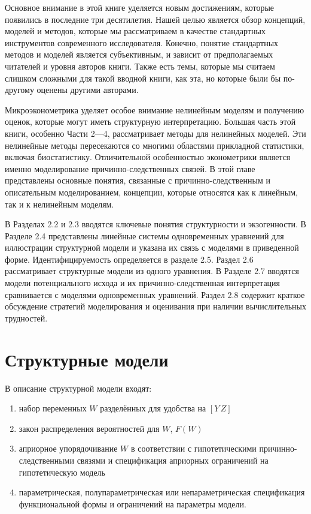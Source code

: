 	
	Основное внимание в этой книге уделяется новым достижениям, которые появились в последние три десятилетия. Нашей целью является обзор концепций, моделей и методов, которые мы рассматриваем в качестве стандартных  инструментов современного исследователя. Конечно, понятие стандартных методов и моделей является субъективным, и зависит от предполагаемых читателей и уровня авторов книги. Также есть темы, которые мы считаем слишком сложными для такой вводной книги, как эта, но которые были бы по-другому оценены другими авторами.
	
		
	Микроэконометрика уделяет особое внимание нелинейным моделям и получению оценок, которые могут иметь структурную интерпретацию. Большая часть этой книги, особенно Части 2---4, рассматривает методы для нелинейных моделей. Эти нелинейные методы пересекаются со многими областями прикладной статистики, включая биостатистику. Отличительной особенностью эконометрики является именно моделирование причинно-следственных связей. В этой главе представлены основные понятия, связанные с причинно-следственным и описательным моделированием, концепции, которые относятся как к линейным, так и к нелинейным моделям. 
	
	
	В Разделах 2.2 и 2.3 вводятся ключевые понятия структурности и экзогенности. В Разделе 2.4 представлены линейные системы одновременных уравнений для иллюстрации структурной модели и указана их связь с моделями в приведенной форме. Идентифицируемость определяется в разделе 2.5.  Раздел 2.6 рассматривает структурные модели из одного уравнения. В Разделе 2.7 вводятся модели потенциального исхода и их причинно-следственная интерпретация сравнивается с моделями одновременных уравнений. Раздел 2.8 содержит краткое обсуждение стратегий моделирования и оценивания при наличии вычислительных трудностей.
	
	
\section{Структурные модели}

В описание структурной модели входят:
\begin{enumerate}
\item набор переменных $W$ разделённых для удобства на $[Y \, Z]$
\item закон распределения вероятностей для $W$, $F(W)$
\item априорное упорядочивание $W$ в соответствии с гипотетическими причинно-следственными связями и спецификация априорных ограничений на гипотетическую модель
\item параметрическая, полупараметрическая или непараметрическая спецификация функциональной формы и ограничений на параметры модели.
\end{enumerate}

